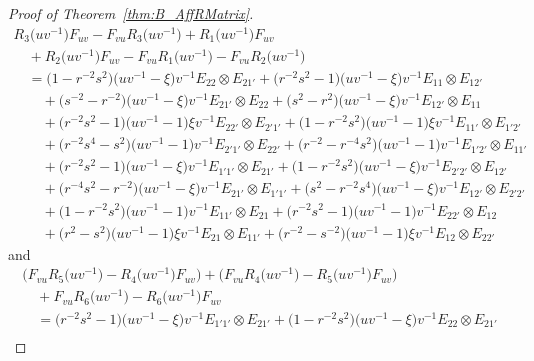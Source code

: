 \documentclass[pdftex]{sigma}
\numberwithin{equation}{section}
\begin{document}
\begin{proof}[Proof of Theorem~\ref{thm:B_AffRMatrix}]
\begin{gather}
 R_{3}\bigl(uv^{-1}\bigr)F_{uv} - F_{vu}R_{3}\bigl(uv^{-1}\bigr) + R_{1}\bigl(uv^{-1}\bigr)F_{uv}\label{eq:R123_affine}\\
\quad{} + R_{2}\bigl(uv^{-1}\bigr)F_{uv} - F_{vu}R_{1}\bigl(uv^{-1}\bigr) - F_{vu}R_{2}\bigl(uv^{-1}\bigr) \nonumber\\
 \quad{} = \bigl(1 - r^{-2}s^{2}\bigr)\bigl(uv^{-1} - \xi\bigr)v^{-1}E_{22} \otimes E_{21'} + \bigl(r^{-2}s^{2} - 1\bigr)\bigl(uv^{-1} - \xi\bigr)v^{-1}E_{11} \otimes E_{12'} \nonumber\\
 \qquad{} + \bigl(s^{-2} - r^{-2}\bigr)\bigl(uv^{-1} - \xi\bigr)v^{-1}E_{21'} \otimes E_{22} + \bigl(s^{2} - r^{2}\bigr)\bigl(uv^{-1} - \xi\bigr)v^{-1}E_{12'} \otimes E_{11} \nonumber\\
 \qquad{} + \bigl(r^{-2}s^{2} - 1\bigr)\bigl(uv^{-1} - 1\bigr)\xi v^{-1}E_{22'} \otimes E_{2'1'} + \bigl(1 - r^{-2}s^{2}\bigr)\bigl(uv^{-1} - 1\bigr)\xi v^{-1}E_{11'} \otimes E_{1'2'} \nonumber\\
 \qquad{} + \bigl(r^{-2}s^{4} - s^{2}\bigr)\bigl(uv^{-1} - 1\bigr)v^{-1}E_{2'1'} \otimes E_{22'} + \bigl(r^{-2} - r^{-4}s^{2}\bigr)\bigl(uv^{-1} - 1\bigr)v^{-1}E_{1'2'} \otimes E_{11'} \nonumber\\
 \qquad{} + \bigl(r^{-2}s^{2} - 1\bigr)\bigl(uv^{-1} - \xi\bigr)v^{-1} E_{1'1'} \otimes E_{21'} + \bigl(1 - r^{-2}s^{2}\bigr)\bigl(uv^{-1} - \xi\bigr)v^{-1}E_{2'2'} \otimes E_{12'} \nonumber\\
 \qquad{} + \bigl(r^{-4}s^{2} - r^{-2}\bigr)\bigl(uv^{-1} - \xi\bigr)v^{-1}E_{21'} \otimes E_{1'1'}+ \bigl(s^{2} - r^{-2}s^{4}\bigr)\bigl(uv^{-1} - \xi\bigr)v^{-1}E_{12'} \otimes E_{2'2'} \nonumber\\
 \qquad{} + \bigl(1 - r^{-2}s^{2}\bigr)\bigl(uv^{-1} - 1\bigr)v^{-1}E_{11'} \otimes E_{21} +\bigl(r^{-2}s^{2} - 1\bigr)\bigl(uv^{-1} - 1\bigr)v^{-1}E_{22'} \otimes E_{12} \nonumber\\
 \qquad{} + \bigl(r^{2} - s^{2}\bigr)\bigl(uv^{-1} - 1\bigr)\xi v^{-1}E_{21} \otimes E_{11'} +\bigl(r^{-2} - s^{-2}\bigr)\bigl(uv^{-1} - 1\bigr)\xi v^{-1}E_{12} \otimes E_{22'}\nonumber
\end{gather}
and
\begin{gather}
 \bigl(F_{vu}R_{5}\bigl(uv^{-1}\bigr) - R_{4}\bigl(uv^{-1}\bigr)F_{uv}\bigr) + \bigl(F_{vu}R_{4}\bigl(uv^{-1}\bigr) - R_{5}\bigl(uv^{-1}\bigr)F_{uv}\bigr) \label{eq:R456_affine}\\
 \quad {}+ F_{vu}R_{6}\bigl(uv^{-1}\bigr) - R_{6}\bigl(uv^{-1}\bigr)F_{uv} \nonumber\\
 \quad{}= \bigl(r^{-2}s^{2} - 1\bigr)\bigl(uv^{-1} - \xi\bigr)v^{-1}E_{1'1'} \otimes E_{21'} + \bigl(1 - r^{-2}s^{2}\bigr)\bigl(uv^{-1} - \xi\bigr)v^{-1}E_{22} \otimes E_{21'} \nonumber\\

\end{gather}
\end{proof}
\end{document}
